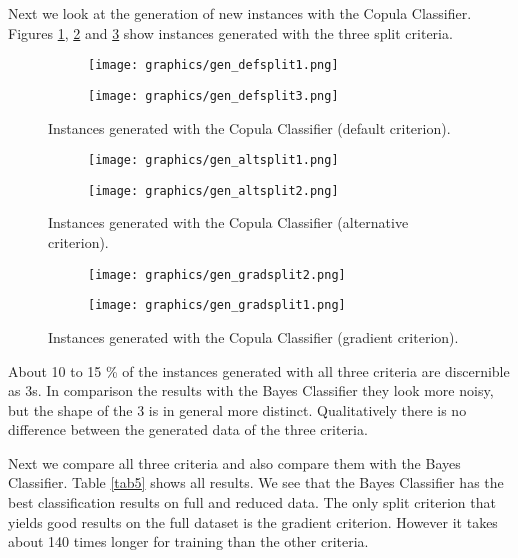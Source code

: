 \documentclass[draft]{article}
\begin{document}
Next we look at the generation of new instances with the Copula Classifier.
Figures \ref{fig3}, \ref{fig4} and \ref{fig5} show instances generated with the three
split criteria.

\begin{figure}[h]
	\centering
	\begin{subfigure}[b]{0.4\textwidth}
		\texttt{[image: graphics/gen\_defsplit1.png]}
	\end{subfigure}
	\begin{subfigure}[b]{0.4\textwidth}
		\texttt{[image: graphics/gen\_defsplit3.png]}
	\end{subfigure}
	\caption{Instances generated with the Copula Classifier (default criterion).}
	\label{fig3}
\end{figure}

\begin{figure}[h]
	\centering
	\begin{subfigure}[b]{0.4\textwidth}
		\texttt{[image: graphics/gen\_altsplit1.png]}
	\end{subfigure}
	\begin{subfigure}[b]{0.4\textwidth}
		\texttt{[image: graphics/gen\_altsplit2.png]}
	\end{subfigure}
	\caption{Instances generated with the Copula Classifier (alternative criterion).}
	\label{fig4}
\end{figure}

\begin{figure}[h]
	\centering
	\begin{subfigure}[b]{0.4\textwidth}
		\texttt{[image: graphics/gen\_gradsplit2.png]}
	\end{subfigure}
	\begin{subfigure}[b]{0.4\textwidth}
		\texttt{[image: graphics/gen\_gradsplit1.png]}
	\end{subfigure}
	\caption{Instances generated with the Copula Classifier (gradient criterion).}
	\label{fig5}
\end{figure}

\FloatBarrier

About 10 to 15 \% of the instances generated with all three criteria are discernible as 3s.
In comparison the results with the Bayes Classifier they look more noisy, but the shape of the 3 is 
in general more distinct. Qualitatively there is no difference between the generated data of the three criteria.

Next we compare all three criteria and also compare them with the Bayes Classifier.
Table \ref{tab5} shows all results. We see that the Bayes Classifier has the best classification
results on full and reduced data. The only split criterion that yields good results on the full dataset is
the gradient criterion. However it takes about 140 times longer for training than the other criteria.
\end{document}
